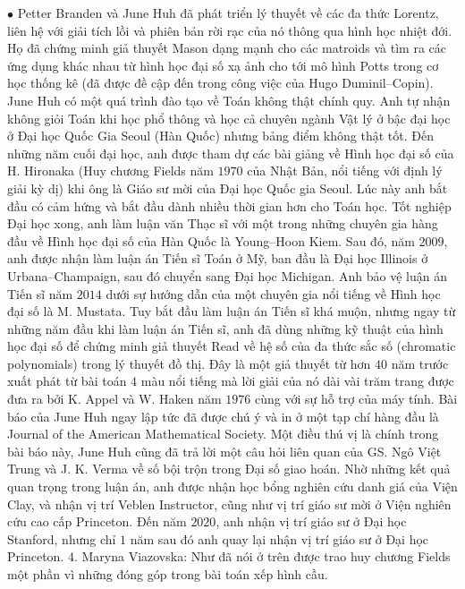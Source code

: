 \begin{multicols}{2}
	\vskip 0.1cm
	$\bullet$ Petter Branden và June Huh đã phát triển lý thuyết về các đa thức Lorentz, liên hệ với giải tích lồi và phiên bản rời rạc của nó thông qua hình học nhiệt đới. Họ đã chứng minh giả thuyết Mason dạng mạnh cho các matroids và tìm ra các ứng dụng khác nhau từ hình học đại số xạ ảnh cho tới mô hình Potts trong cơ học thống kê (đã được đề cập đến trong công việc của Hugo Duminil--Copin).
	\vskip 0.1cm 
	June Huh có một quá trình đào tạo về Toán không thật chính quy. Anh tự nhận không giỏi Toán khi học phổ thông và học cả chuyên ngành Vật lý ở bậc đại học ở Đại học Quốc Gia Seoul (Hàn Quốc) nhưng bảng điểm không thật tốt. Đến những năm cuối đại học, anh được tham dự các bài giảng về Hình học đại số của H. Hironaka (Huy chương Fields năm $1970$ của Nhật Bản, nổi tiếng với định lý giải kỳ dị) khi ông là Giáo sư mời của Đại học Quốc gia Seoul. Lúc này anh bắt đầu có cảm hứng và bắt đầu dành nhiều thời gian hơn cho Toán học. Tốt nghiệp Đại học xong, anh làm luận văn Thạc sĩ với một trong những chuyên gia hàng đầu về Hình học đại số của Hàn Quốc là Young--Hoon Kiem. Sau đó, năm $2009$, anh được nhận làm luận án Tiến sĩ Toán ở Mỹ, ban đầu là Đại học Illinois ở Urbana--Champaign, sau đó chuyển sang Đại học Michigan. Anh bảo vệ luận án Tiến sĩ năm $2014$ dưới sự hướng dẫn của một chuyên gia nổi tiếng về Hình học đại số là M. Mustata. Tuy bắt đầu làm luận án Tiến sĩ khá muộn, nhưng ngay từ những năm đầu khi làm luận án Tiến sĩ, anh đã dùng những kỹ thuật của hình học đại số để chứng minh giả thuyết Read về hệ số của đa thức sắc số (chromatic polynomials) trong lý thuyết đồ thị. Đây là một giả thuyết từ hơn $40$ năm trước xuất phát từ bài toán $4$ màu nổi tiếng mà lời giải của nó dài vài trăm trang được đưa ra bởi K. Appel và W. Haken năm $1976$ cùng với sự hỗ trợ của máy tính. Bài báo của June Huh ngay lập tức đã được chú ý và in ở một tạp chí hàng đầu là Journal of the American Mathematical Society. Một điều thú vị là chính trong bài báo này, June Huh cũng đã trả lời một câu hỏi liên quan của GS. Ngô Việt Trung và J. K. Verma về số bội trộn trong Đại số giao hoán. Nhờ những kết quả quan trọng trong luận án, anh được nhận học bổng nghiên cứu danh giá của Viện Clay, và nhận vị trí Veblen Instructor, cũng như vị trí giáo sư mời ở Viện nghiên cứu cao cấp Princeton. Đến năm $2020$, anh nhận vị trí giáo sư ở Đại học Stanford, nhưng chỉ $1$ năm sau đó anh quay lại nhận vị trí giáo sư ở Đại học Princeton.     
	\vskip 0.1cm
	$4.$ Maryna Viazovska: Như đã nói ở trên được trao huy chương Fields một phần vì những đóng góp trong bài toán xếp hình cầu.
	\vskip 0.1cm

\end{multicols}
